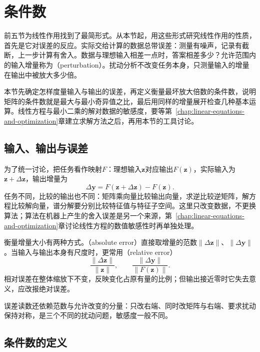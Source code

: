 
\section{条件数}
\label{sec:ls-perturbation}
\label{sec:linear-algebra-stability}
\label{sec:matrix-analysis-conditioning-perturbation}

前五节为线性作用找到了最简形式。从本节起，用这些形式研究线性作用的性质，首先是它对误差的反应。实际交给计算的数据总带误差：测量有噪声，记录有截断，上一步计算有舍入。数据与理想输入相差一点时，答案相差多少？允许范围内的输入增量称为（perturbation）。扰动分析不改变任务本身，只测量输入的增量在输出中被放大多少倍。

本节先确定怎样度量输入与输出的误差，再定义衡量最坏放大倍数的条件数，说明矩阵的条件数就是最大与最小奇异值之比，最后用同样的增量展开检查几种基本运算。线性方程与最小二乘的解对数据的敏感度，要等第~\ref{chap:linear-equations-and-optimization}章建立求解方法之后，再用本节的工具讨论。

\subsection{输入、输出与误差}

为了统一讨论，把任务看作映射$F$：理想输入$\bm z$对应输出$F(\bm z)$，实际输入为$\bm z+\Delta\bm z$，输出增量为
\[
 \Delta\bm y=F(\bm z+\Delta\bm z)-F(\bm z).
\]
任务不同，比较的输出也不同：矩阵乘向量比较输出向量，求逆比较逆矩阵，解方程比较解向量，谱分解要分别比较特征值与特征子空间。这里只改变数据，不更换算法；算法在机器上产生的舍入误差是另一个来源，第~\ref{chap:linear-equations-and-optimization}章讨论线性方程的数值敏感性时再单独处理。

衡量增量大小有两种方式。（absolute error）直接取增量的范数$\lVert\Delta\bm z\rVert$、$\lVert\Delta\bm y\rVert$。当输入与输出本身有尺度时，更常用（relative error）
\[
 \frac{\lVert\Delta\bm z\rVert}{\lVert\bm z\rVert},
 \qquad
 \frac{\lVert\Delta\bm y\rVert}{\lVert F(\bm z)\rVert}.
\]
相对误差在整体缩放下不变，反映变化占原有量的比例；但输出接近零时它失去意义，应改报绝对误差。

误差读数还依赖范数与允许改变的分量：只改右端、同时改矩阵与右端、要求扰动保持对称，是三个不同的扰动问题，敏感度一般不同。

\subsection{条件数的定义}
\label{sec:ls-perturbation-conditioning}

